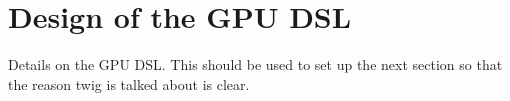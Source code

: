 \section{Design of the GPU DSL}

Details on the GPU DSL.  This should be used to set up the next section so
that the reason twig is talked about is clear.
